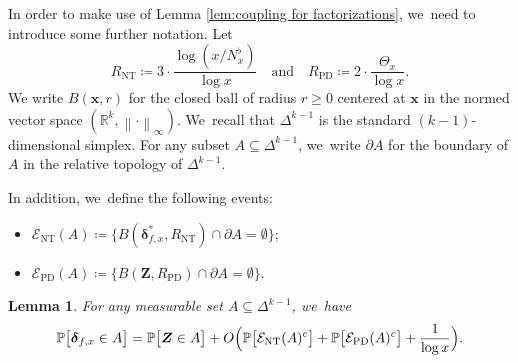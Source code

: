 \documentclass[10pt]{amsart}
\newcommand{\bx}{{\boldsymbol x}}
\newcommand{\bZ}{{\boldsymbol Z}}
\newcommand{\RR}{\mathbb{R}}
\newcommand{\PP}{\mathbb{P}}
\newcommand{\bolddelta}{\boldsymbol{\delta}}
\newcommand{\EC}{\mathcal{E}}
\newcommand{\maxnorm}[1]{\left\| #1 \right\|_{\infty}}
\newcommand{\simplex}{\Delta^{k-1}}
\newcommand{\bg}{\big}
\newcommand{\Rnt}{R_{\mathrm{NT}}}
\newcommand{\Rprob}{R_{\mathrm{PD}}}
\newcommand{\ECnt}{\EC_{\mathrm{NT}}}
\newcommand{\ECprob}{\EC_{\mathrm{PD}}}
\theoremstyle{plain}
\newtheorem{lem}[cor]{Lemma}
\theoremstyle{definition}
\begin{document}
In order to make use of Lemma \ref{lem:coupling for factorizations}, we~need to introduce some further notation. Let
\[
\Rnt \coloneqq 3\cdot \frac{\log(x/N_x^\flat)}{\log x} \quad \text{and} \quad \Rprob \coloneqq 2\cdot \frac{\Theta_x}{\log x}.
\]
We write $B(\bx,r)$ for the closed ball of radius $r \ge 0$ centered at $\bx$ in the normed vector space $(\RR^k, \maxnorm{\cdot})$. We~recall that $\simplex$ is the standard $(k-1)$-dimensional simplex. For any subset $A \subseteq \simplex$, we~write $\partial A$ for the boundary of $A$ in the relative topology of $\simplex$.

In addition, we~define the following events:
\begin{itemize}
\item $\ECnt(A) \coloneqq \bg\{ B(\bolddelta_{f, x}^*, \Rnt)\cap \partial A=\emptyset\bg\}$;

\item $\ECprob(A) \coloneqq \bg\{ B(\bZ, \Rprob) \cap \partial A = \emptyset \bg\}$.
\end{itemize}

\begin{lem}
\label{lem:sym diff D and Z}
For any measurable set $A\subseteq\simplex$, we~have
\[
\PP\bg[\bolddelta_{f, x} \in A\bg] = \PP\bg[\bZ \in A\bg] + O\Bigl(\PP\bg[\ECnt(A)^c\bg] + \PP\bg[\ECprob(A)^c\bg] + \frac{1}{\log x}\Bigr).
\]
\end{lem}
\end{document}
